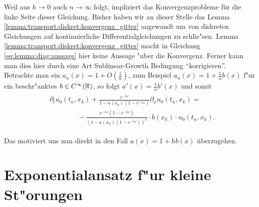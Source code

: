 Weil aus $h \to 0$ auch $n \to \infty$ folgt, impliziert das Konvergenzprobleme für die linke Seite dieser Gleichung.
Bisher haben wir an dieser Stelle das Lemma \ref{lemma:transport:diskret:konvergenz_gitter} angewandt um von diskreten Gleichungen auf kontinuierliche Differentialgleichungen zu schlie"sen.
Lemma \ref{lemma:transport:diskret:konvergenz_gitter} macht in Gleichung \eqref{eq:lemma:diag:aussage} hier keine Aussage "uber die Konvergenz.
Ferner kann man dies hier durch eine Art Sublinear-Growth Bedingung ``korrigieren''.
Betrachte man ein $a_n(x) = 1 + O\left(\frac{1}{n} \right)$, zum Beispiel $a_n(x) = 1 + \frac{1}{n} b(x)$ f"ur ein beschr"anktes $b \in C^\infty(\mathbb R)$, so folgt $a'(x) = \frac{1}{n} b'(x)$ und somit
\begin{align}\label{eq:wkb:ohpost2}
\begin{split}
&\partial_t u_0(t_n, x_k) + \frac{e^{-i \omega}}{1 - a(x_k) (1-e^{-i\omega})} \partial_x u_0(t_n, x_k) =\\
&\qquad \qquad - \frac{e^{-i \omega} (1 - e^{-i\omega})}{(1 - a(x_k) (1-e^{-i\omega}))^2} \cdot b(x_k) \cdot u_0(t_n, x_k).
\end{split}
\end{align}

Das motiviert uns nun direkt in den Fall $a(x) = 1 + hb(x)$ überzugehen.

\section{Exponentialansatz f"ur kleine St"orungen}


